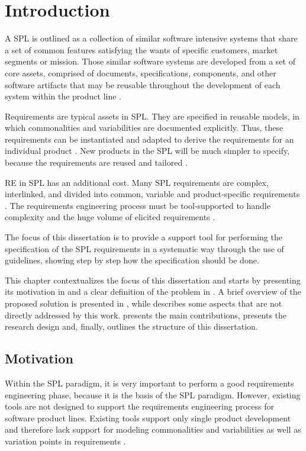 \chapter{Introduction}
\label{ch:introduction} 
A \acf{SPL} is outlined as a collection of similar software intensive systems
that share a set of common features satisfying the wants of specific customers, market segments 
or mission. Those similar software systems are developed from a set of core assets, comprised of 
documents, specifications, components, and other software artifacts that may be reusable throughout 
the development of each system within the product line
\citep{rafael2013systems}.

Requirements are typical assets in \ac{SPL}. They are specified in reusable models,
in which commonalities and variabilities are documented explicitly. Thus, these 
requirements can be instantiated and adapted to derive the requirements for an 
individual product \citep{cheng2007research}. New products in the SPL will be
much simpler to specify, because the requirements are reused and tailored
\citep{clements2002software}.

\acf{RE} in \ac{SPL} has an additional cost. Many \ac{SPL} requirements are
complex, interlinked, and divided into common, variable and product-specific requirements 
\citep{birk2003report,de2014defining}.  The requirements engineering process
must be tool-supported to handle complexity and the huge volume of elicited requirements
\citep{birk2003report}.

The focus of this dissertation is to provide a support tool for performing the specification of the 
\ac{SPL} requirements in a systematic way through the use of guidelines,  showing step by step how the 
specification should be done.

This chapter contextualizes the focus of this dissertation and starts by
presenting its motivation in  and a clear definition of the problem in 
. A brief overview of the proposed solution is presented in
, while  describes some aspects that
are not directly addressed by this work.
 presents the main contributions,  
 presents the research design  and, finally,
 outlines the structure of this dissertation.

\section{Motivation}
\label{sc:motivation}
Within the \ac{SPL} paradigm, it is very important to perform a good requirements
engineering phase, because it is the basis of the  \ac{SPL} paradigm. However, existing 
tools are not designed to support the requirements engineering process for software 
product lines. Existing tools support only single product development and therefore 
lack support for modeling commonalities and variabilities as well as variation points in 
requirements \citep{birk2003report}.

